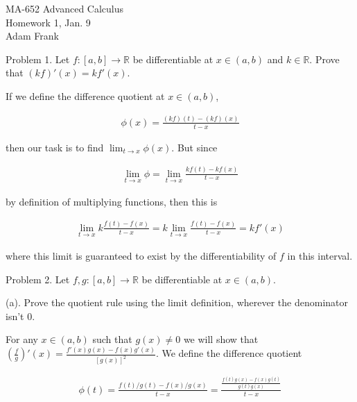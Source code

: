 \documentclass{article}
\begin{document}
  \begin{center} \Large
    MA-652 Advanced Calculus\\
    Homework 1, Jan. 9 \\
    Adam Frank
  \end{center}

  \vspace{1cm}

  {\Large \color{Sepia} Problem 1.  Let $f:[a,b]\to \mathbb R$ be differentiable at $x\in (a,b)$ and $k\in \mathbb R$.  Prove that $(kf)'(x) = kf'(x)$.}

  \vspace{1cm}

  If we define the difference quotient at $x\in (a,b)$,

  \begin{align*}
    \phi(x) = \frac{(kf)(t)-(kf)(x)}{t-x}
  \end{align*}

  then our task is to find $\displaystyle\lim_{t\to x}\phi(x)$.  But since

  \begin{align*}
    \lim_{t\to x}\phi = \lim_{t\to x}\frac{kf(t)-kf(x)}{t-x}
  \end{align*}

  by definition of multiplying functions, then this is

  \begin{align*}
    \lim_{t\to x}k\frac{f(t)-f(x)}{t-x} = k\lim_{t\to x}\frac{f(t)-f(x)}{t-x} = kf'(x)
  \end{align*}

  where this limit is guaranteed to exist by the differentiability of $f$ in this interval.

  \pagebreak


  {\Large \color{Sepia} Problem 2.  Let $f,g:[a,b]\to \mathbb R$ be differentiable at $x\in (a,b)$.

  (a). Prove the quotient rule using the limit definition, wherever the denominator isn't 0.}

  \vspace{1cm}

  For any $x\in (a,b)$ such that $g(x)\ne 0$ we will show that $\left(\frac{f}{g}\right)'(x) = \frac{f'(x)g(x)-f(x)g'(x)}{[g(x)]^2}$.  We define the difference quotient

  \begin{align*}
    \phi(t) = \frac{f(t)/g(t)-f(x)/g(x)}{t-x} = \frac{\frac{f(t)g(x)-f(x)g(t)}{g(t)g(x)}}{t-x}
  \end{align*}
\end{document}
